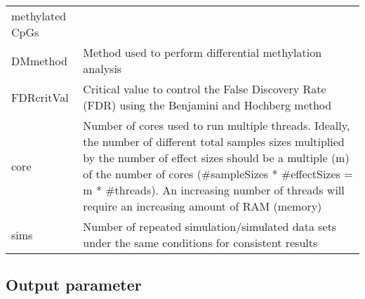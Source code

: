 \documentclass[]{article}
\begin{document}
\begin{longtable}[]{@{}ll@{}}
\begin{minipage}[t]{0.76\columnwidth}
methylated CpGs\strut
\end{minipage}\tabularnewline
\begin{minipage}[t]{0.18\columnwidth}\raggedright\strut
DMmethod\strut
\end{minipage} & \begin{minipage}[t]{0.76\columnwidth}\raggedright\strut
Method used to perform differential methylation analysis\strut
\end{minipage}\tabularnewline
\begin{minipage}[t]{0.18\columnwidth}\raggedright\strut
FDRcritVal\strut
\end{minipage} & \begin{minipage}[t]{0.76\columnwidth}\raggedright\strut
Critical value to control the False Discovery Rate (FDR) using the
Benjamini and Hochberg method\strut
\end{minipage}\tabularnewline
\begin{minipage}[t]{0.18\columnwidth}\raggedright\strut
core\strut
\end{minipage} & \begin{minipage}[t]{0.76\columnwidth}\raggedright\strut
Number of cores used to run multiple threads. Ideally, the number of
different total samples sizes multiplied by the number of effect sizes
should be a multiple (m) of the number of cores (\#sampleSizes *
\#effectSizes = m * \#threads). An increasing number of threads will
require an increasing amount of RAM (memory)\strut
\end{minipage}\tabularnewline
\begin{minipage}[t]{0.18\columnwidth}\raggedright\strut
sims\strut
\end{minipage} & \begin{minipage}[t]{0.76\columnwidth}\raggedright\strut
Number of repeated simulation/simulated data sets under the same
conditions for consistent results\strut
\end{minipage}\tabularnewline
\bottomrule
\end{longtable}

\subsection{Output parameter}\label{output-parameter}
\end{document}
